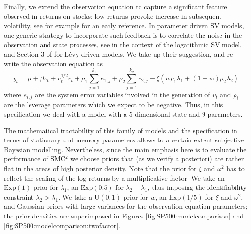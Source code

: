\documentclass{statsoc}
\newcommand{\SMCSQ}{SMC$^2$\xspace}
\begin{document}
Finally, we extend the observation equation to capture a significant
feature observed in returns on stocks: low returns provoke
increase in subsequent volatility, see for example \cite{black} for
an early reference. In parameter driven SV models, one generic
strategy to incorporate such feedback is to correlate the noise in the
observation and state processes, see \cite{harvey:shep}  in the
context of the logarithmic  SV model, and Section 3 of \cite{bns:ou}  for L\'evy
driven models.  We take up their suggestion, and re-write the
observation equation as 
\begin{equation}
  \label{eq:sv-obs-lev}
  y_t = \mu + \beta v_t + v_t^{1/2} \epsilon_t + \rho_1
  \sum_{j=1}^{k_1} e_{1,j} + \rho_2  \sum_{j=1}^{k_2} e_{2,j} -
\xi(w \rho_1  \lambda_1 + (1-w) \rho_2  \lambda_2) 
\end{equation}
where $e_{i,j}$ are the system error variables involved in the
generation of $v_t$ and $\rho_i$ are the leverage parameters which we
expect to be negative. Thus, in this specification we deal with a
model with a 5-dimensional state and 9 parameters. 

The mathematical tractability of this family of models and the
specification in terms of stationary and memory parameters allows 
to a certain extent subjective Bayesian modelling. Nevertheless, since
the main emphasis here is to evaluate the performance of \SMCSQ we
choose priors that (as we verify a posteriori) are rather flat in the areas of
high posterior density. Note that   the prior for $\xi$ and $\omega^2$ has to
reflect the scaling of the log-returns by a multiplicative factor. We
take an $\mathrm{Exp}(1)$  prior for $\lambda_1$, 
an $\mathrm{Exp}(0.5)$ for $\lambda_2-\lambda_1$, thus imposing the identifiability
constraint  $\lambda_2>\lambda_1$. We take a $\mathrm{U}(0,1)$ prior for $w$,
an $\mathrm{Exp}(1/5)$ for $\xi$ and $\omega^2$,  and Gaussian priors with large
variances  for the
observation equation parameters; the prior densities are superimposed
in Figures \ref{fig:SP500:modelcomparison}  and
\ref{fig:SP500:modelcomparison:twofactor}. 
\end{document}
